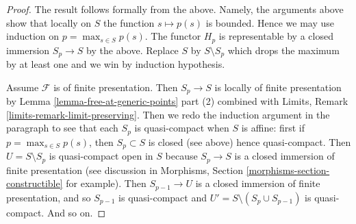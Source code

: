\begin{proof}
\medskip\noindent
The result follows formally from the above.
Namely, the arguments above show that locally on $S$ the function
$s \mapsto p(s)$ is bounded. Hence we may use induction
on $p = \max_{s \in S} p(s)$. The functor $H_p$ is representable
by a closed immersion $S_p \to S$ by the above. Replace $S$ by
$S \setminus S_p$ which drops the maximum by at least one and
we win by induction hypothesis.

\medskip\noindent
Assume $\mathcal{F}$ is of finite presentation.
Then $S_p \to S$ is locally of finite presentation by
Lemma \ref{lemma-free-at-generic-points} part (2) combined with
Limits, Remark \ref{limits-remark-limit-preserving}.
Then we redo the induction argument in the paragraph to
see that each $S_p$ is quasi-compact when $S$ is affine:
first if $p = \max_{s \in S} p(s)$, then $S_p \subset S$
is closed (see above) hence quasi-compact. Then $U = S \setminus S_p$
is quasi-compact open in $S$ because $S_p \to S$ is a closed
immersion of finite presentation (see discussion in Morphisms, Section
\ref{morphisms-section-constructible} for example). Then $S_{p - 1} \to U$
is a closed immersion of finite presentation, and so $S_{p - 1}$
is quasi-compact and $U' = S \setminus (S_p \cup S_{p - 1})$
is quasi-compact. And so on.
\end{proof}
